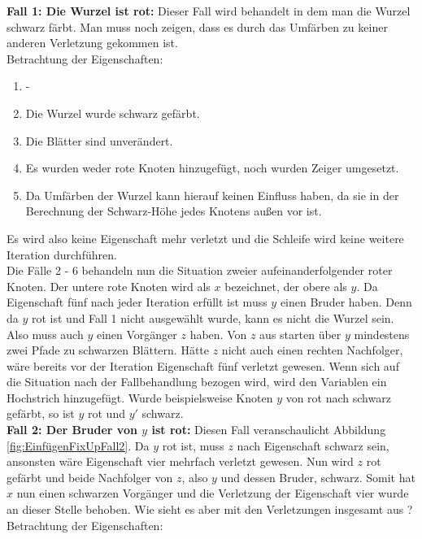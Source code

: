 \documentclass[a4paper,12pt]{article}
\begin{document}
\noindent\textbf{Fall 1: Die Wurzel ist rot: }
Dieser Fall wird behandelt in dem man die Wurzel schwarz färbt. Man muss noch zeigen, dass es durch das Umfärben zu keiner anderen Verletzung gekommen ist.\\

Betrachtung der Eigenschaften:
\begin{enumerate}
	\item -
	\item Die Wurzel wurde schwarz gefärbt.
	\item Die Blätter sind unverändert.
	\item Es wurden weder rote Knoten hinzugefügt, noch wurden Zeiger umgesetzt. 
	\item Da Umfärben der Wurzel kann hierauf keinen Einfluss haben, da sie in der Berechnung der Schwarz-Höhe jedes  Knotens außen vor ist.
\end{enumerate}  

\noindent Es wird also keine Eigenschaft mehr verletzt und die Schleife wird keine weitere Iteration durchführen.\\
 Die Fälle 2 - 6 behandeln nun die Situation zweier aufeinanderfolgender roter Knoten. Der untere rote Knoten wird als $x$ bezeichnet, der obere als $y$. Da Eigenschaft fünf nach jeder Iteration erfüllt ist muss $y$ einen Bruder haben. Denn da $y$ rot ist und Fall 1 nicht ausgewählt wurde, kann es nicht die Wurzel sein. Also muss auch $y$ einen Vorgänger $z$ haben. Von $z$ aus starten über $y$ mindestens zwei Pfade zu schwarzen Blättern. Hätte $z$ nicht auch einen rechten Nachfolger, wäre bereits vor der Iteration Eigenschaft fünf verletzt gewesen. Wenn sich auf die Situation nach der Fallbehandlung bezogen wird, wird den Variablen ein Hochstrich hinzugefügt. Wurde beispielsweise Knoten $y$ von rot nach schwarz gefärbt, so ist $y$ rot und $y'$ schwarz. \\
 
\noindent\textbf{Fall 2: Der Bruder von $y$ ist rot: }
\noindent Diesen Fall veranschaulicht Abbildung \ref{fig:EinfügenFixUpFall2}. Da $y$ rot ist, muss $z$ nach Eigenschaft schwarz sein, ansonsten wäre Eigenschaft vier mehrfach verletzt gewesen. Nun wird $z$ rot gefärbt und beide Nachfolger von $z$, also $y$ und dessen Bruder, schwarz. Somit hat $x$ nun einen schwarzen Vorgänger und die Verletzung der Eigenschaft vier wurde an dieser Stelle behoben. Wie sieht es aber mit den Verletzungen insgesamt aus ? \\

Betrachtung der Eigenschaften:
\end{document}
